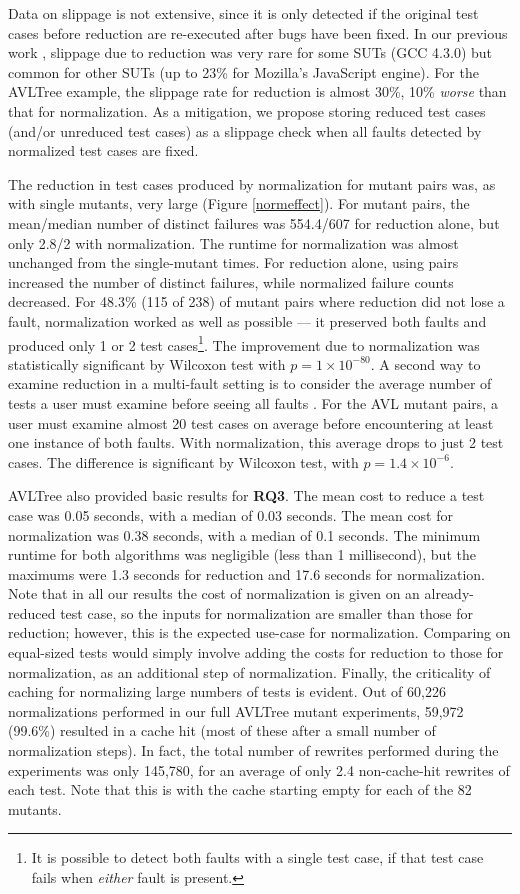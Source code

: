 Data on slippage is not extensive, since it is only detected if the original test
cases before reduction are re-executed after bugs have been
fixed.  In our previous work \cite{PLDI13}, slippage due to
reduction was very rare for some SUTs (GCC 4.3.0) but common
for other SUTs (up to 23\% for Mozilla's JavaScript engine).  For the AVLTree example, the slippage rate for reduction is almost 30\%,
10\% \emph{worse} than that for normalization.  As a mitigation, we propose
storing reduced test cases (and/or unreduced test
cases) as a slippage check when all faults detected by normalized test
cases are fixed.

The reduction in test cases produced by normalization for mutant pairs
was, as with single mutants, very large (Figure \ref{normeffect}).
For mutant pairs, the mean/median number of distinct failures was
554.4/607 for reduction alone, but only 2.8/2 with
normalization.  The runtime for normalization was almost
unchanged from the single-mutant times.  For reduction
alone, using pairs increased the number of distinct failures, while
normalized failure counts decreased.  For 48.3\% (115 of 238) of
mutant pairs where reduction did not lose a fault, normalization
worked as well as possible --- it preserved both faults and produced only 1 or 2 test
cases\footnote{It is possible to detect both faults with a single test
  case, if that test case fails when \emph{either} fault is
  present.}.  The improvement due to normalization was
statistically significant by Wilcoxon test with $p=1\times10^{-80}$.
A second way to examine reduction in a multi-fault setting is to
consider the average number of tests a user must examine before seeing
all faults \cite{PLDI13}.  For the AVL mutant pairs, a user must
examine almost 20 test cases on average before encountering at least
one instance of both faults.  With normalization, this average drops
to just 2 test cases.  The difference is significant by Wilcoxon
test, with $p=1.4\times10^{-6}$.

AVLTree also provided basic results for {\bf RQ3}. The mean cost to reduce a
test case was 0.05 seconds, with a median of 0.03 seconds.  The mean
cost for normalization was 0.38 seconds, with a median of 0.1 seconds.
The minimum runtime for both algorithms was negligible (less than 1
millisecond), but the maximums were 1.3 seconds for reduction and 17.6
seconds for normalization.  Note that in all our results the cost of
normalization is given on an already-reduced test case, so the inputs
for normalization are smaller than those for reduction; however, this
is the expected use-case for normalization.  Comparing on equal-sized
tests would simply involve adding the costs for reduction to those for
normalization, as an additional step of normalization.  Finally, the
criticality of caching for normalizing large numbers of tests is
evident.  Out of 60,226 normalizations performed in our full AVLTree mutant
experiments, 59,972 (99.6\%) resulted in a cache hit (most of these
after a small number of normalization steps).  In fact, the total
number of rewrites performed during the experiments was only 145,780,
for an average of only 2.4 non-cache-hit rewrites of each test.  Note
that this is with the cache starting empty for each of the 82 mutants.

